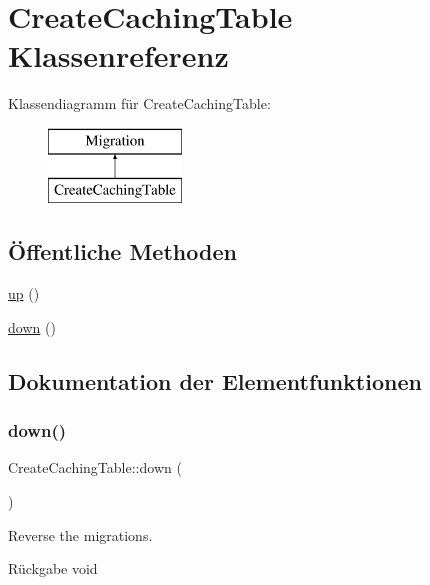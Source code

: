 \hypertarget{classCreateCachingTable}{}\section{Create\+Caching\+Table Klassenreferenz}
\label{classCreateCachingTable}
Klassendiagramm für Create\+Caching\+Table\+:\begin{figure}[H]
\begin{center}
\leavevmode
\includegraphics[height=2.000000cm]{d5/d84/classCreateCachingTable}
\end{center}
\end{figure}
\subsection*{Öffentliche Methoden}
\begin{DoxyCompactItemize}
\item 
\hyperlink{classCreateCachingTable_a1c3852551b978f5b856fc8495d153d28}{up} ()
\item 
\hyperlink{classCreateCachingTable_a5110b7f80ce227d2f6123a364fd51597}{down} ()
\end{DoxyCompactItemize}


\subsection{Dokumentation der Elementfunktionen}
\mbox{\label{classCreateCachingTable_a5110b7f80ce227d2f6123a364fd51597}} 
\subsubsection{\texorpdfstring{down()}{down()}}
{\footnotesize\ttfamily Create\+Caching\+Table\+::down (\begin{DoxyParamCaption}{ }\end{DoxyParamCaption})}

Reverse the migrations.

\begin{DoxyReturn}{Rückgabe}
void 
\end{DoxyReturn}
\mbox{\label{classCreateCachingTable_a1c3852551b978f5b856fc8495d153d28}} 
